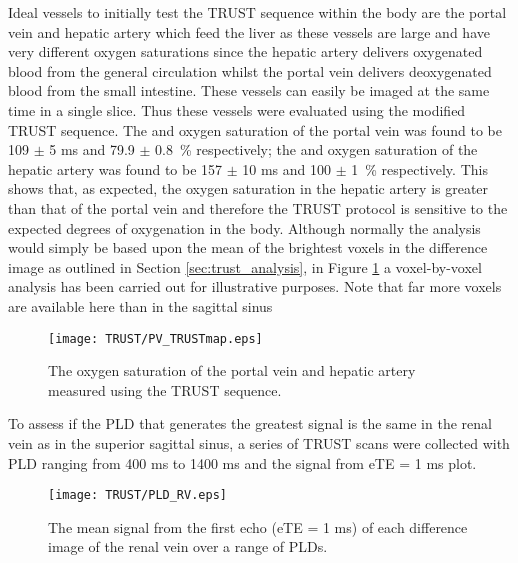 Ideal vessels to initially test the \ac{TRUST} sequence within the body are the portal vein and hepatic artery which feed the liver as these vessels are large and have very different oxygen saturations since the hepatic artery delivers oxygenated blood from the general circulation whilst the portal vein delivers deoxygenated blood from the small intestine. These vessels can easily be imaged at the same time in a single slice. Thus these vessels were evaluated using the modified \ac{TRUST} sequence. The \ttwo and oxygen saturation of the portal vein was found to be 109 $\pm$ 5 ms and 79.9 $\pm$ 0.8~\% respectively; the \ttwo and oxygen saturation of the hepatic artery was found to be 157 $\pm$ 10 ms and 100 $\pm$ 1~\% respectively. This shows that, as expected, the oxygen saturation in the hepatic artery is greater than that of the portal vein and therefore the \ac{TRUST} protocol is sensitive to the expected degrees of oxygenation in the body. Although normally the analysis would simply be based upon the mean of the brightest voxels in the difference image as outlined in Section \ref{sec:trust_analysis}, in Figure \ref{fig:pv_TRUST} a voxel-by-voxel analysis has been carried out for illustrative purposes. Note that far more voxels are available here than in the sagittal sinus

\begin{figure}[h]
	\centering
	\texttt{[image: TRUST/PV\_TRUSTmap.eps]}
	\caption{The oxygen saturation of the portal vein and hepatic artery measured using the \ac{TRUST} sequence.}
	\label{fig:pv_TRUST}	
\end{figure}
To assess if the \ac{PLD} that generates the greatest signal is the same in the renal vein as in the superior sagittal sinus, a series of \ac{TRUST} scans were collected with \ac{PLD} ranging from 400 ms to 1400 ms and the signal from \ac{eTE} = 1 ms plot.

\begin{figure}[H]
	\centering
	\texttt{[image: TRUST/PLD\_RV.eps]}
	\caption{The mean signal from the first echo (\ac{eTE} = 1 ms) of each difference image of the renal vein over a range of \acp{PLD}.}
	\label{fig:Sig_vs_PLD_RV}
\end{figure}

